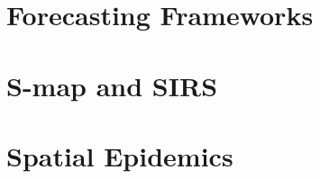 \documentclass[12pt, twoside]{report}
\makeatletter
\let\org@subfile
\renewcommand*{}[1]{%
  \filename@parse{#1}%
  \expandafter
  \graphicspath\expandafter{\expandafter{\filename@area}}%
  \org@subfile{#1}%
}
\makeatother
\begin{document}
		

	\chapter{Forecasting Frameworks}

		

	\chapter{S-map and SIRS}

		

	\chapter{Spatial Epidemics}

		

		



	
\end{document}
